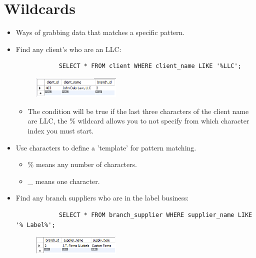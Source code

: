 \section{Wildcards}
\begin{itemize}
    \item Ways of grabbing data that matches a specific pattern.
    \item Find any client's who are an LLC:
        \begin{verbatim}
            SELECT * FROM client WHERE client_name LIKE '%LLC';
        \end{verbatim}
        \begin{figure}[H]
            \centering
            \includegraphics[width=0.4\textwidth]{./Figs/2020-12-24-21-00-45.png}
        \end{figure}
        \begin{itemize}
            \item The condition will be true if the last three characters of the client name are LLC, the \% wildcard allows you to not specify from which character index you must start.
        \end{itemize}
    
    \item Use characters to define a 'template' for pattern matching.
        \begin{itemize}
            \item \% means any number of characters.
            \item \_ means one character.
        \end{itemize}
    
    \item Find any branch suppliers who are in the label business:
        \begin{verbatim}
            SELECT * FROM branch_supplier WHERE supplier_name LIKE '% Label%';
        \end{verbatim}
        \begin{figure}[H]
            \centering
            \includegraphics[width=0.4\textwidth]{./Figs/2020-12-24-21-01-12.png}
        \end{figure}
    

\end{itemize}
